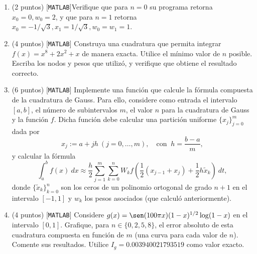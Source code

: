 \documentclass[12pt,final,twoside,notitlepage]{article}
\begin{document}
\begin{enumerate}
\begin{enumerate}
\item (2 puntos) [\texttt{MATLAB}]Verifique que para $n=0$ su programa retorna $x_0=0, w_0=2$, y que para $n=1$ retorna $x_0 = -1/\sqrt{3}, x_1=1/\sqrt{3},w_0 = w_1 =1$.
\item (4 puntos) [\texttt{MATLAB}] Construya una cuadratura que permita integrar $f(x)=x^8+2x^2+x$ de manera exacta. Utilice el mínimo valor de $n$ posible. Escriba los nodos y pesos que utilizó, y verifique que obtiene el resultado correcto.
\item (6 puntos) [\texttt{MATLAB}] Implemente una función que calcule la fórmula compuesta de la cuadratura de Gauss. Para ello, considere como entrada el intervalo $[a,b]$, el número de subintervalos $m$, el valor $n$ para la cuadratura de Gauss y la función $f$. Dicha función debe calcular una partición uniforme $\{x_j\}_{j=0}^m$ dada por 
$$x_j:= a+j h\ (j=0,\ldots,m),\quad \text{con }\ h = \dfrac{b-a}{m},$$ 
y calcular la fórmula
$$\int_a^b f(x) \ dx \approx \dfrac{h}{2}\sum_{j=1}^m \sum_{k=0}^n W_k f\left( \dfrac{1}{2}(x_{j-1}+x_j) + \dfrac{1}{2} h \widetilde{x}_k\right) \ dt,$$ donde $\lbrace\widetilde{x}_k\rbrace_{k=0}^n$ son los ceros de un polinomio ortogonal de grado $n+1$ en el intervalo $[-1,1]$ y $w_k$ los pesos asociados (que calculó anteriormente).
\item (4 puntos) [\texttt{MATLAB}] Considere $g(x) = \sen(100\pi x)(1-x)^{1/2} \log(1-x)$ en el intervalo $[0,1]$. Grafique, para $n\in \{ 0,2,5,8\}$, el error absoluto de esta cuadratura compuesta en función de $m$ (una curva para cada valor de $n$). Comente sus resultados. Utilice $I_g=0.003940021793519$ como valor exacto.
\end{enumerate}


\end{enumerate}
\end{document}
